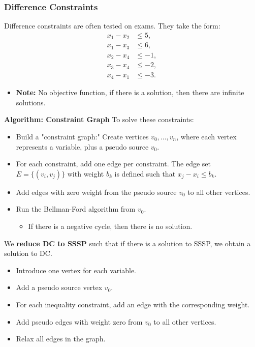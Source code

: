 \subsubsection{Difference Constraints}
\begin{example}
Difference constraints are often tested on exams. They take the form:
\begin{align*}
x_1 - x_2 &\leq 5, \\
x_1 - x_3 &\leq 6, \\
x_2 - x_4 &\leq -1, \\
x_3 - x_4 &\leq -2, \\
x_4 - x_1 &\leq -3.
\end{align*}
\begin{itemize}
    \item \textbf{Note:} No objective function, if there is a solution, then there are infinite solutions.
\end{itemize}

\textbf{Algorithm: Constraint Graph}
    To solve these constraints:
    \begin{itemize}
        \item Build a "constraint graph:" Create vertices \( v_0, \dots, v_n \), where each vertex represents a variable, plus a pseudo source \( v_0 \).
        \item For each constraint, add one edge per constraint. The edge set \( E = \{ (v_i, v_j) \} \) with weight \( b_k \) is defined such that \( x_j - x_i \leq b_k \).
        \item Add edges with zero weight from the pseudo source \( v_0 \) to all other vertices.
        \item Run the Bellman-Ford algorithm from \( v_0 \).
        \begin{itemize}
            \item If there is a negative cycle, then there is no solution.
        \end{itemize}
    \end{itemize}
    \vspace{1em}

    We \textbf{reduce DC to SSSP} such that if there is a solution to SSSP, we obtain a solution to DC.

    \begin{itemize}
        \item Introduce one vertex for each variable.
        \item Add a pseudo source vertex \( v_0 \).
        \item For each inequality constraint, add an edge with the corresponding weight.
        \item Add pseudo edges with weight zero from \( v_0 \) to all other vertices.
        \item Relax all edges in the graph.
    \end{itemize}
    \vspace{1em}


\end{example}
